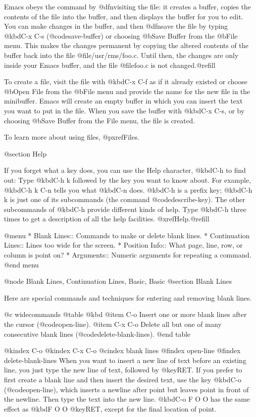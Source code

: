 {{  Emacs obeys the command by @dfn{visiting} the file: it creates a
buffer, copies the contents of the file into the buffer, and then
displays the buffer for you to edit.  You can make changes in the
buffer, and then @dfn{save} the file by typing @kbd{C-x C-s}
(@code{save-buffer}) or choosing @b{Save Buffer} from the @b{File} menu.  This
makes the changes permanent by copying the altered contents of the
buffer back into the file @file{/usr/rms/foo.c}.  Until then, the
changes are only inside your Emacs buffer, and the file @file{foo.c} is
not changed.@refill

  To create a file, visit the file with @kbd{C-x C-f} as if it already
existed or choose @b{Open File} from the @b{File} menu and provide the
name for the new file in the minibuffer.  Emacs will create an empty
buffer in which you can insert the text you want to put in the file.
When you save the buffer with @kbd{C-x C-s}, or by choosing @b{Save
Buffer} from the File menu, the file is created.

  To learn more about using files, @pxref{Files}.

@section Help

  If you forget what a key does, you can use the Help character,
@kbd{C-h} to find out: Type @kbd{C-h k} followed by the key you want to know
about.  For example, @kbd{C-h k C-n} tells you what @kbd{C-n}
does.  @kbd{C-h} is a prefix key; @kbd{C-h k} is just one of its
subcommands (the command @code{describe-key}).  The other subcommands of
@kbd{C-h} provide different kinds of help.  Type @kbd{C-h} three times
to get a description of all the help facilities.  @xref{Help}.@refill

@menu
* Blank Lines::        Commands to make or delete blank lines.
* Continuation Lines:: Lines too wide for the screen.
* Position Info::      What page, line, row, or column is point on?
* Arguments::	       Numeric arguments for repeating a command.
@end menu

@node Blank Lines, Continuation Lines, Basic, Basic
@section Blank Lines

  Here are special commands and techniques for entering and removing
blank lines.

@c widecommands
@table @kbd
@item C-o
Insert one or more blank lines after the cursor (@code{open-line}).
@item C-x C-o
Delete all but one of many consecutive blank lines
(@code{delete-blank-lines}).
@end table

@kindex C-o
@kindex C-x C-o
@cindex blank lines
@findex open-line
@findex delete-blank-lines
  When you want to insert a new line of text before an existing line,
you just type the new line of text, followed by @key{RET}.  If you
prefer to first create a blank line and then insert the desired text,
use the key @kbd{C-o} (@code{open-line}), which inserts a newline after
point but leaves point in front of the newline.  Then type
the text into the new line.  @kbd{C-o F O O} has the same effect as
@kbd{F O O @key{RET}}, except for the final location of point.

}}

